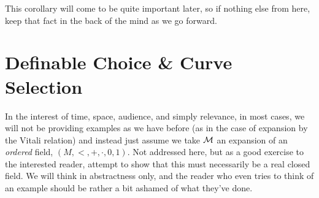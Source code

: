 This corollary will come to be quite important later, so if nothing else from here, keep that fact in the back of the mind as we go forward.

\section{Definable Choice \& Curve Selection}
\noindent In the interest of time, space, audience, and simply relevance, in most cases, we will not be providing examples as we have before (as in the case of expansion by the Vitali relation) and instead just assume we take $\mathcal{M}$ an \om expansion of an \emph{ordered} field, $(M, <, +, \cdot, 0, 1)$. Not addressed here, but as a good exercise to the interested reader, attempt to show that this must necessarily be a real closed field. We will think in abstractness only, and the reader who even tries to think of an example should be rather a bit ashamed of what they've done.

